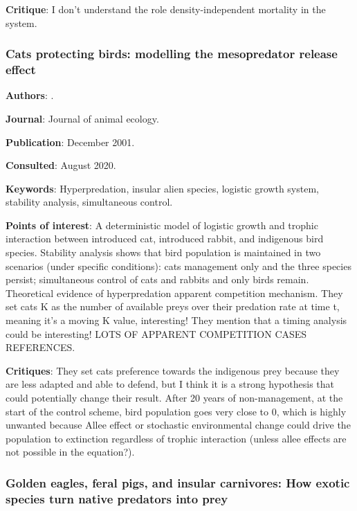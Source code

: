 \documentclass[12pt,a4paper]{article}
\begin{document}
\textbf{Critique}: I don't understand the role density-independent mortality in the system. 

\newpage

\subsubsection*{Cats protecting birds: modelling the mesopredator release effect}

\textbf{Authors}: \cite{courchamp1999cats}.

\textbf{Journal}: Journal of animal ecology.

\textbf{Publication}: December 2001.

\textbf{Consulted}: August 2020.

\textbf{Keywords}: Hyperpredation, insular alien species, logistic growth system, stability analysis, simultaneous control.

\textbf{Points of interest}: A deterministic model of logistic growth and trophic interaction between introduced cat, introduced rabbit, and indigenous bird species. Stability analysis shows that bird population is maintained in two scenarios (under specific conditions): cats management only and the three species persist; simultaneous control of cats and rabbits and only birds remain. Theoretical evidence of hyperpredation apparent competition mechanism. They set cats K as the number of available preys over their predation rate at time t, meaning it's a moving K value, interesting! They mention that a timing analysis could be interesting!
LOTS OF APPARENT COMPETITION CASES REFERENCES.

\textbf{Critiques}: They set cats preference towards the indigenous prey because they are less adapted and able to defend, but I think it is a strong hypothesis that could potentially change their result. After 20 years of non-management, at the start of the control scheme, bird population goes very close to 0, which is highly unwanted because Allee effect or stochastic environmental change could drive the population to extinction regardless of trophic interaction (unless allee effects are not possible in the equation?).

\newpage

\subsubsection*{Golden eagles, feral pigs, and insular carnivores: How exotic species turn native predators into prey}
\end{document}
